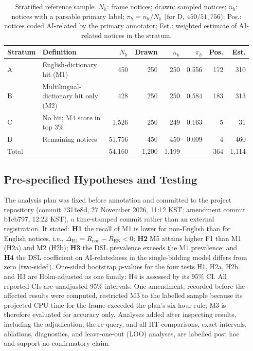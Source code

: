\documentclass[runningheads]{llncs}
\begin{document}
\begin{table}[t]
\caption{Stratified reference sample. $N_h$: frame notices; drawn: sampled notices; $n_h$: notices with a parsable primary label; $\pi_h=n_h/N_h$ (for D, $450/51{,}756$); Pos.: notices coded AI-related by the primary annotator; Est.: weighted estimate of AI-related notices in the stratum.}\label{tab:design}
\centering
\begin{tabular}{llrrrrrr}
\toprule
Stratum & Definition & $N_h$ & Drawn & $n_h$ & $\pi_h$ & Pos. & Est. \\
\midrule
A & English-dictionary hit (M1) & 450 & 250 & 250 & 0.556 & 172 & 310 \\
B & Multilingual-dictionary hit only (M2) & 428 & 250 & 250 & 0.584 & 183 & 313 \\
C & No hit; M4 score in top 3\% & 1,526 & 250 & 249 & 0.163 & 5 & 31 \\
D & Remaining notices & 51,756 & 450 & 450 & 0.009 & 4 & 460 \\
\midrule
Total & & 54,160 & 1,200 & 1,199 & & 364 & 1,114 \\
\bottomrule
\end{tabular}
\end{table}

\subsection{Pre-specified Hypotheses and Testing}
The analysis plan was fixed before annotation and committed to the project repository (commit 7314e8d, 27 November 2026, 11:12 KST; amendment commit b1eb797, 12:22 KST), a time-stamped commit rather than an external registration. It stated: \textbf{H1} the recall of M1 is lower for non-English than for English notices, i.e., $\Delta_{\mathrm{H1}}=R_{\mathrm{non}}-R_{\mathrm{EN}}<0$; \textbf{H2} M5 attains higher F1 than M1 (H2a) and M2 (H2b); \textbf{H3} the DSL prevalence exceeds the M1 prevalence; and \textbf{H4} the DSL coefficient on AI-relatedness in the single-bidding model differs from zero (two-sided). One-sided bootstrap $p$-values for the four tests H1, H2a, H2b, and H3 are Holm-adjusted as one family; H4 is assessed by its 95\% CI. All reported CIs are unadjusted 95\% intervals. One amendment, recorded before the affected results were computed, restricted M3 to the labelled sample because its projected CPU time for the frame exceeded the plan's six-hour rule; M3 is therefore evaluated for accuracy only. Analyses added after inspecting results, including the adjudication, the re-query, and all HT comparisons, exact intervals, ablations, diagnostics, and leave-one-out (LOO) analyses, are labelled post hoc and support no confirmatory claim.
\end{document}
